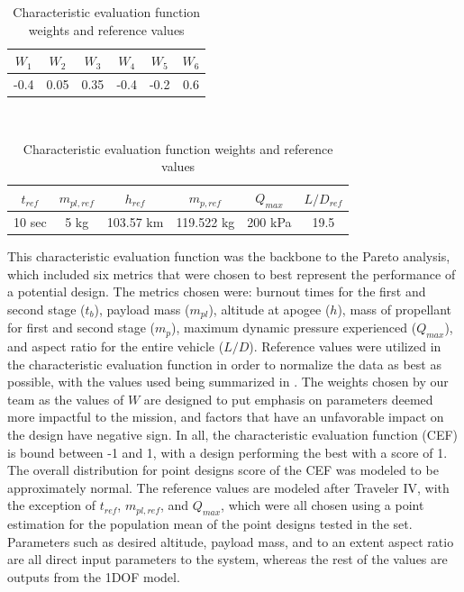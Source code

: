 \begin{table}
    \centering
    \begin{tabular}{cccccc}
        \(W_1\) & \(W_2\) & \(W_3\) & \(W_4\) & \(W_5\) & \(W_6\) \\ \hline
        -0.4 & 0.05 & 0.35 & -0.4 & -0.2 & 0.6
    \end{tabular}
    \vspace{0.3cm} \\
    \begin{tabular}{cccccc}
        \(t_{ref}\) & \(m_{pl,ref}\) & \(h_{ref}\) & \(m_{p,ref}\) & \(Q_{max}\) & \(L/D_{ref}\) \\ \hline
        10 sec & 5 kg & 103.57 km & 119.522 kg & 200 kPa & 19.5
    \end{tabular}
    \caption{Characteristic evaluation function weights and reference values}
    \label{table:CEF-weights-ref}
\end{table}

This characteristic evaluation function was the backbone to the Pareto analysis, which included six metrics that were chosen to best represent the performance of a potential design. The metrics chosen were: burnout times for the first and second stage (\(t_b\)), payload mass (\(m_{pl}\)), altitude at apogee (\(h\)), mass of propellant for first and second stage (\(m_p\)), maximum dynamic pressure experienced (\(Q_{max}\)), and aspect ratio for the entire vehicle (\(L/D\)). Reference values were utilized in the characteristic evaluation function in order to normalize the data as best as possible, with the values used being summarized in . The weights chosen by our team as the values of \(W\) are designed to put emphasis on parameters deemed more impactful to the mission, and factors that have an unfavorable impact on the design have negative sign. In all, the characteristic evaluation function (CEF) is bound between -1 and 1, with a design performing the best with a score of 1. The overall distribution for point designs score of the CEF was modeled to be approximately normal. The reference values are modeled after Traveler IV, with the exception of \(t_{ref}\), \(m_{pl,ref}\), and \(Q_{max}\), which were all chosen using a point estimation for the population mean of the point designs tested in the set. Parameters such as desired altitude, payload mass, and to an extent aspect ratio are all direct input parameters to the system, whereas the rest of the values are outputs from the 1DOF model.

